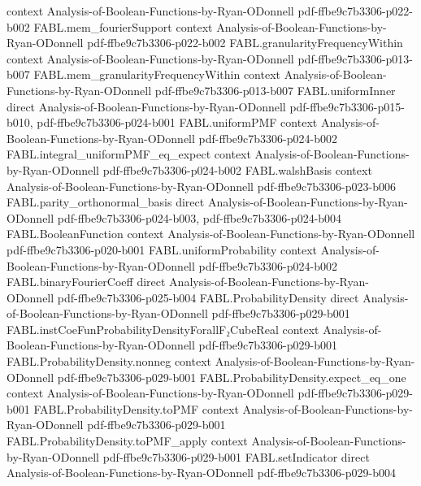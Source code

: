 \begin{theorem}
  {context}
  {Analysis-of-Boolean-Functions-by-Ryan-ODonnell}
  {pdf-ffbe9c7b3306-p022-b002}
\proofstep
  {FABL.mem_fourierSupport}
  {context}
  {Analysis-of-Boolean-Functions-by-Ryan-ODonnell}
  {pdf-ffbe9c7b3306-p022-b002}
\proofstep
  {FABL.granularityFrequencyWithin}
  {context}
  {Analysis-of-Boolean-Functions-by-Ryan-ODonnell}
  {pdf-ffbe9c7b3306-p013-b007}
\proofstep
  {FABL.mem_granularityFrequencyWithin}
  {context}
  {Analysis-of-Boolean-Functions-by-Ryan-ODonnell}
  {pdf-ffbe9c7b3306-p013-b007}
\proofstep
  {FABL.uniformInner}
  {direct}
  {Analysis-of-Boolean-Functions-by-Ryan-ODonnell}
  {pdf-ffbe9c7b3306-p015-b010,
    pdf-ffbe9c7b3306-p024-b001}
\proofstep
  {FABL.uniformPMF}
  {context}
  {Analysis-of-Boolean-Functions-by-Ryan-ODonnell}
  {pdf-ffbe9c7b3306-p024-b002}
\proofstep
  {FABL.integral_uniformPMF_eq_expect}
  {context}
  {Analysis-of-Boolean-Functions-by-Ryan-ODonnell}
  {pdf-ffbe9c7b3306-p024-b002}
\proofstep
  {FABL.walshBasis}
  {context}
  {Analysis-of-Boolean-Functions-by-Ryan-ODonnell}
  {pdf-ffbe9c7b3306-p023-b006}
\proofstep
  {FABL.parity_orthonormal_basis}
  {direct}
  {Analysis-of-Boolean-Functions-by-Ryan-ODonnell}
  {pdf-ffbe9c7b3306-p024-b003,
    pdf-ffbe9c7b3306-p024-b004}
\proofstep
  {FABL.BooleanFunction}
  {context}
  {Analysis-of-Boolean-Functions-by-Ryan-ODonnell}
  {pdf-ffbe9c7b3306-p020-b001}
\proofstep
  {FABL.uniformProbability}
  {context}
  {Analysis-of-Boolean-Functions-by-Ryan-ODonnell}
  {pdf-ffbe9c7b3306-p024-b002}
\proofstep
  {FABL.binaryFourierCoeff}
  {direct}
  {Analysis-of-Boolean-Functions-by-Ryan-ODonnell}
  {pdf-ffbe9c7b3306-p025-b004}
\proofstep
  {FABL.ProbabilityDensity}
  {direct}
  {Analysis-of-Boolean-Functions-by-Ryan-ODonnell}
  {pdf-ffbe9c7b3306-p029-b001}
\proofstep
  {FABL.instCoeFunProbabilityDensityForallF₂CubeReal}
  {context}
  {Analysis-of-Boolean-Functions-by-Ryan-ODonnell}
  {pdf-ffbe9c7b3306-p029-b001}
\proofstep
  {FABL.ProbabilityDensity.nonneg}
  {context}
  {Analysis-of-Boolean-Functions-by-Ryan-ODonnell}
  {pdf-ffbe9c7b3306-p029-b001}
\proofstep
  {FABL.ProbabilityDensity.expect_eq_one}
  {context}
  {Analysis-of-Boolean-Functions-by-Ryan-ODonnell}
  {pdf-ffbe9c7b3306-p029-b001}
\proofstep
  {FABL.ProbabilityDensity.toPMF}
  {context}
  {Analysis-of-Boolean-Functions-by-Ryan-ODonnell}
  {pdf-ffbe9c7b3306-p029-b001}
\proofstep
  {FABL.ProbabilityDensity.toPMF_apply}
  {context}
  {Analysis-of-Boolean-Functions-by-Ryan-ODonnell}
  {pdf-ffbe9c7b3306-p029-b001}
\proofstep
  {FABL.setIndicator}
  {direct}
  {Analysis-of-Boolean-Functions-by-Ryan-ODonnell}
  {pdf-ffbe9c7b3306-p029-b004}

\end{theorem}
